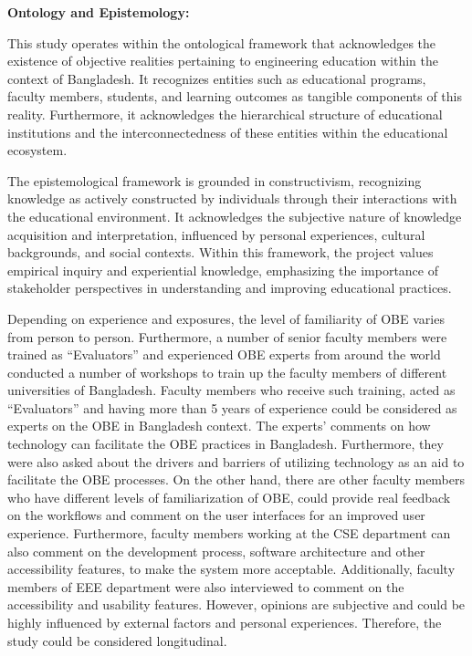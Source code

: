 \documentclass[journal,onecolumn]{IEEEtran}
\begin{document}
\textbf{Ontology and Epistemology:}


This study operates within the ontological framework that acknowledges the existence of objective realities pertaining to engineering education within the context of Bangladesh. It recognizes entities such as educational programs, faculty members, students, and learning outcomes as tangible components of this reality. Furthermore, it acknowledges the hierarchical structure of educational institutions and the interconnectedness of these entities within the educational ecosystem.

The epistemological framework is grounded in constructivism, recognizing knowledge as actively constructed by individuals through their interactions with the educational environment. It acknowledges the subjective nature of knowledge acquisition and interpretation, influenced by personal experiences, cultural backgrounds, and social contexts. Within this framework, the project values empirical inquiry and experiential knowledge, emphasizing the importance of stakeholder perspectives in understanding and improving educational practices.

Depending on experience and exposures, the level of familiarity of OBE varies from person to person. Furthermore, a number of senior faculty members were trained as “Evaluators” and experienced OBE experts from around the world conducted a number of workshops to train up the faculty members of different universities of Bangladesh. Faculty members who receive such training, acted as “Evaluators” and having more than 5 years of experience could be considered as experts on the OBE in Bangladesh context. The experts’ comments on how technology can facilitate the OBE practices in Bangladesh. Furthermore, they were also asked about the drivers and barriers of utilizing technology as an aid to facilitate the OBE processes. On the other hand, there are other faculty members who have different levels of familiarization of OBE, could provide real feedback on the workflows and comment on the user interfaces for an improved user experience. Furthermore, faculty members working at the CSE department can also comment on the development process, software architecture and other accessibility features, to make the system more acceptable. Additionally, faculty members of EEE department were also interviewed to comment on the accessibility and usability features. However, opinions are subjective and could be highly influenced by external factors and personal experiences. Therefore, the study could be considered longitudinal.
\vspace{6pt}
\end{document}
